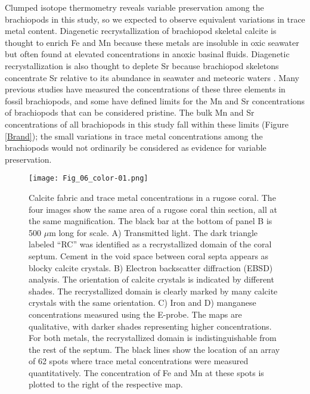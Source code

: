 \documentclass[5p, authoryear]{elsarticle}
\begin{document}
Clumped isotope thermometry reveals variable preservation among the brachiopods in this study, so we expected to observe equivalent variations in trace metal content. Diagenetic recrystallization of brachiopod skeletal calcite is thought to enrich Fe and Mn because these metals are insoluble in oxic seawater but often found at elevated concentrations in anoxic basinal fluids. Diagenetic recrystallization is also thought to deplete Sr because brachiopod skeletons concentrate Sr relative to its abundance in seawater and meteoric waters \citep{Brand1980, Shields2003}. Many previous studies have measured the concentrations of these three elements in fossil brachiopods, and some have defined limits for the Mn and Sr concentrations of brachiopods that can be considered pristine. The bulk Mn and Sr concentrations of all brachiopods in this study fall within these limits (Figure \ref{Brand}); the small variations in trace metal concentrations among the brachiopods would not ordinarily be considered as evidence for variable preservation. 

\begin{figure*}[tb]
\centering
\texttt{[image: Fig\_06\_color-01.png]}
\caption{Calcite fabric and trace metal concentrations in a rugose coral. The four images show the same area of a rugose coral thin section, all at the same magnification. The black bar at the bottom of panel B is 500 $\mu$m long for scale. A) Transmitted light. The dark triangle labeled ``RC'' was identified as a recrystallized domain of the coral septum. Cement in the void space between coral septa appears as blocky calcite crystals. B) Electron backscatter diffraction (EBSD) analysis. The orientation of calcite crystals is indicated by different shades. The recrystallized domain is clearly marked by many calcite crystals with the same orientation. C) Iron and D) manganese concentrations measured using the E-probe. The maps are qualitative, with darker shades representing higher concentrations. For both metals, the recrystallized domain is indistinguishable from the rest of the septum. The black lines show the location of an array of 62 spots where trace metal concentrations were measured quantitatively. The concentration of Fe and Mn at these spots is plotted to the right of the respective map.}
\label{EBSD_coral}
\end{figure*}
\end{document}
